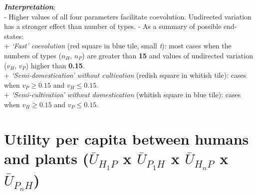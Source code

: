 \documentclass[
]{book}
\begin{document}
\textbf{\emph{Interpretation}}:\\
- Higher values of all four parameters facilitate coevolution. Undirected variation has a stronger effect than number of types.
- As a summary of possible end-states:\\
+ \emph{`Fast' coevolution} (red square in blue tile, small \emph{t}): most cases when the numbers of types (\(n_{H}\), \(n_{P}\)) are greater than \textbf{15} and values of undirected variation (\(v_{H}\), \(v_{P}\)) higher than \textbf{0.15}.\\
+ \emph{`Semi-domestication' without cultivation} (redish square in whitish tile): cases when \(v_{P}\geq 0.15\) and \(v_{H}\leq 0.15\).\\
+ \emph{`Semi-cultivation' without domestication} (whitish square in blue tile): cases when \(v_{H}\geq 0.15\) and \(v_{P}\leq 0.15\).

\newpage

\hypertarget{utility-per-capita-between-humans-and-plants-baru_h_1p-x-baru_p_1h-x-baru_h_np-x-baru_p_nh}{%
\section{\texorpdfstring{Utility per capita between humans and plants (\(\bar{U}_{H_{1}P}\) x \(\bar{U}_{P_{1}H}\) x \(\bar{U}_{H_{n}P}\) x \(\bar{U}_{P_{n}H}\))}{Utility per capita between humans and plants (\textbackslash bar\{U\}\_\{H\_\{1\}P\} x \textbackslash bar\{U\}\_\{P\_\{1\}H\} x \textbackslash bar\{U\}\_\{H\_\{n\}P\} x \textbackslash bar\{U\}\_\{P\_\{n\}H\})}}\label{utility-per-capita-between-humans-and-plants-baru_h_1p-x-baru_p_1h-x-baru_h_np-x-baru_p_nh}}

\end{document}
